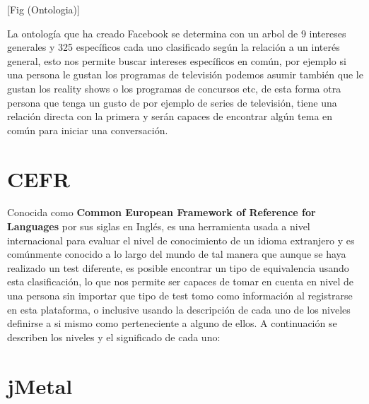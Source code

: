 [Fig (Ontologia)]

La ontología que ha creado Facebook se determina con un arbol de 9 intereses generales y 325 específicos cada uno clasificado según la relación a un interés general, esto nos permite buscar intereses específicos en común, por ejemplo si una persona le gustan los programas de televisión podemos asumir también que le gustan los reality shows o los programas de concursos etc, de esta forma otra persona que tenga un gusto de por ejemplo de series de televisión, tiene una relación directa con la primera y serán capaces de encontrar algún tema en común para iniciar una conversación.

\section{CEFR}

Conocida como \textbf{Common European Framework of Reference for Languages} por sus siglas en Inglés, es una herramienta usada a nivel internacional para evaluar el nivel de conocimiento de un idioma extranjero y es comúnmente conocido a lo largo del mundo de tal manera que aunque se haya realizado un test diferente, es posible encontrar un tipo de equivalencia usando esta clasificación, lo que nos permite ser capaces de tomar en cuenta en nivel de una persona sin importar que tipo de test tomo como información al registrarse en esta plataforma, o inclusive usando la descripción de cada uno de los niveles definirse a si mismo como perteneciente a alguno de ellos.
A continuación se describen los niveles y el significado de cada uno:




\section{jMetal}

